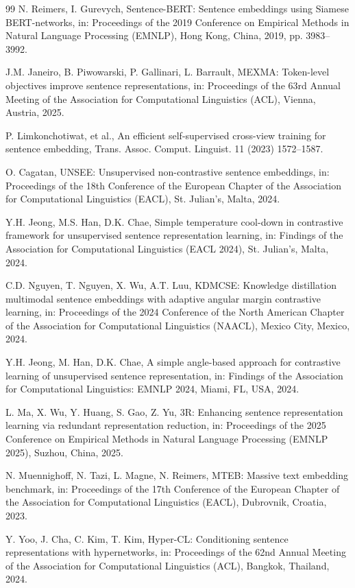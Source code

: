 \documentclass[lettersize,journal]{IEEEtran}
\begin{document}
\begin{thebibliography}{99}
N. Reimers, I. Gurevych, Sentence-BERT: Sentence embeddings using Siamese BERT-networks, in: Proceedings of the 2019 Conference on Empirical Methods in Natural Language Processing (EMNLP), Hong Kong, China, 2019, pp. 3983--3992.

J.M. Janeiro, B. Piwowarski, P. Gallinari, L. Barrault, MEXMA: Token-level objectives improve sentence representations, in: Proceedings of the 63rd Annual Meeting of the Association for Computational Linguistics (ACL), Vienna, Austria, 2025.

P. Limkonchotiwat, et al., An efficient self-supervised cross-view training for sentence embedding, Trans. Assoc. Comput. Linguist. 11 (2023) 1572--1587.

O. Cagatan, UNSEE: Unsupervised non-contrastive sentence embeddings, in: Proceedings of the 18th Conference of the European Chapter of the Association for Computational Linguistics (EACL), St. Julian's, Malta, 2024.

Y.H. Jeong, M.S. Han, D.K. Chae, Simple temperature cool-down in contrastive framework for unsupervised sentence representation learning, in: Findings of the Association for Computational Linguistics (EACL 2024), St. Julian's, Malta, 2024.

C.D. Nguyen, T. Nguyen, X. Wu, A.T. Luu, KDMCSE: Knowledge distillation multimodal sentence embeddings with adaptive angular margin contrastive learning, in: Proceedings of the 2024 Conference of the North American Chapter of the Association for Computational Linguistics (NAACL), Mexico City, Mexico, 2024.

Y.H. Jeong, M. Han, D.K. Chae, A simple angle-based approach for contrastive learning of unsupervised sentence representation, in: Findings of the Association for Computational Linguistics: EMNLP 2024, Miami, FL, USA, 2024.

L. Ma, X. Wu, Y. Huang, S. Gao, Z. Yu, 3R: Enhancing sentence representation learning via redundant representation reduction, in: Proceedings of the 2025 Conference on Empirical Methods in Natural Language Processing (EMNLP 2025), Suzhou, China, 2025.

N. Muennighoff, N. Tazi, L. Magne, N. Reimers, MTEB: Massive text embedding benchmark, in: Proceedings of the 17th Conference of the European Chapter of the Association for Computational Linguistics (EACL), Dubrovnik, Croatia, 2023.

Y. Yoo, J. Cha, C. Kim, T. Kim, Hyper-CL: Conditioning sentence representations with hypernetworks, in: Proceedings of the 62nd Annual Meeting of the Association for Computational Linguistics (ACL), Bangkok, Thailand, 2024.

\end{thebibliography}
\end{document}
